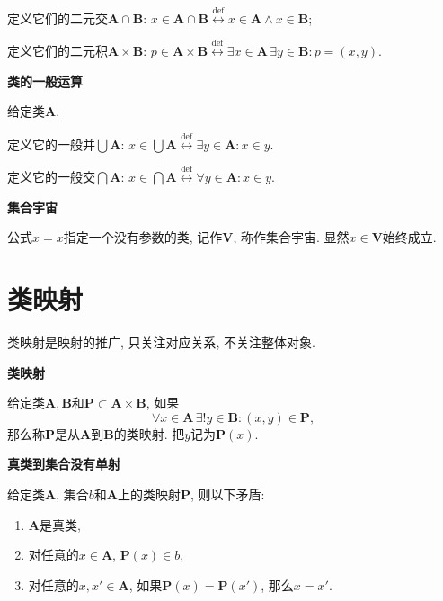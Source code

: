 定义它们的二元交$\mathbf{A}\cap\mathbf{B}$:
$x\in\mathbf{A}\cap\mathbf{B}\overset{\mathrm{def}}{\leftrightarrow}
x\in\mathbf{A}\land x\in\mathbf{B}$;

定义它们的二元积$\mathbf{A}\times\mathbf{B}$:
$p\in\mathbf{A}\times\mathbf{B}\overset{\mathrm{def}}{\leftrightarrow}
\exists x\in\mathbf{A}\,\exists y\in\mathbf{B}:p=(x,y)$.

\vspace{10pt}

\hypertarget{sec:类的一般运算}{}
\noindent\textbf{类的一般运算}

给定类$\mathbf{A}$.

定义它的一般并$\displaystyle\bigcup\mathbf{A}$:
$\displaystyle x\in\bigcup\mathbf{A}\overset{\mathrm{def}}{\leftrightarrow}
\exists y\in\mathbf{A}:x\in y$.

定义它的一般交$\displaystyle\bigcap\mathbf{A}$:
$\displaystyle x\in\bigcap\mathbf{A}\overset{\mathrm{def}}{\leftrightarrow}
\forall y\in\mathbf{A}:x\in y$.

\vspace{10pt}

\hypertarget{sec:集合宇宙}{}
\noindent\textbf{集合宇宙}

公式$x=x$指定一个没有参数的类, 记作$\mathbf{V}$, 称作集合宇宙.
显然$x\in\mathbf{V}$始终成立.





\newpage

\section*{类映射}

类映射是映射的推广, 只关注对应关系, 不关注整体对象.

\vspace{10pt}

\hypertarget{sec:类映射}{}
\noindent\textbf{类映射}

给定类$\mathbf{A},\mathbf{B}$和$\mathbf{P}\subset\mathbf{A}\times\mathbf{B}$,
如果
\[
    \forall x\in\mathbf{A}\,\exists!y\in\mathbf{B}:(x,y)\in\mathbf{P},
\]
那么称$\mathbf{P}$是从$\mathbf{A}$到$\mathbf{B}$的类映射. 把$y$记为$\mathbf{P}(x)$.

\vspace{10pt}

\hypertarget{sec:真类到集合没有单射}{}
\noindent\textbf{真类到集合没有单射}

给定类$\mathbf{A}$, 集合$b$和$\mathbf{A}$上的类映射$\mathbf{P}$, 则以下矛盾:
\begin{enumerate}
    \item $\mathbf{A}$是真类,
    \item 对任意的$x\in\mathbf{A}$, $\mathbf{P}(x)\in b$,
    \item 对任意的$x,x'\in\mathbf{A}$,
    如果$\mathbf{P}(x)=\mathbf{P}(x')$, 那么$x=x'$.
\end{enumerate}

